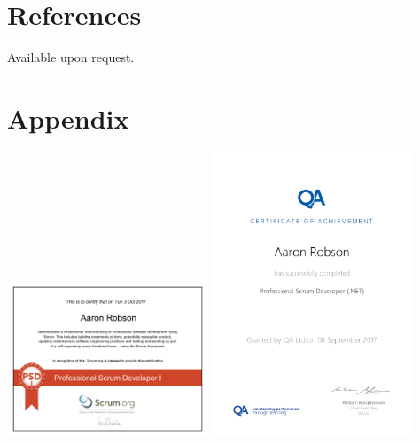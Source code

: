 \documentclass[line,margin]{res}
\begin{document}
\begin{resume}
\section{References}
Available upon request.

\section{Appendix}
\includegraphics[width=0.45\textwidth]{proof/PSDI.PDF}
\includegraphics[width=0.45\textwidth]{proof/50226508_1920.pdf}

\end{resume}
\end{document}
